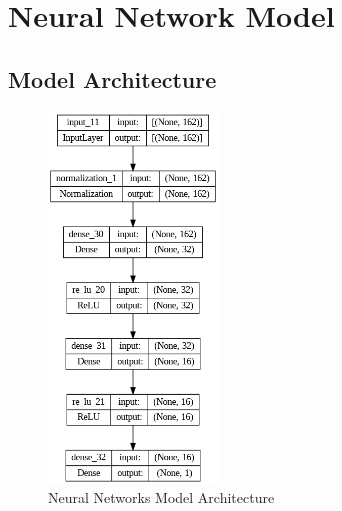 
\section{Neural Network Model}

\subsection{Model Architecture}
\begin{figure}[H]
    \centering
    \includegraphics[width=0.4\textwidth]{figures/nn_architecture.png}
    \caption{Neural Networks Model Architecture}
    \label{fig:neural_networks_architecture}
\end{figure}

